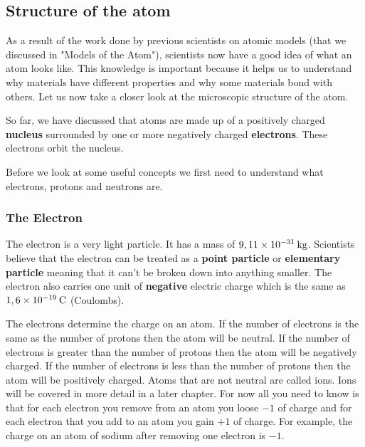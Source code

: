             \subsection{ Structure of the atom}
            \nopagebreak
      \label{m38745*id255206}As a result of the work done by previous scientists on atomic models (that we discussed in "Models of the Atom"), scientists now have a good idea of what an atom looks like. This knowledge is important because it helps us to understand why materials have different properties and why some materials bond with others. Let us now take a closer look at the microscopic structure of the atom.\par 
      \label{m38745*id255216}So far, we have discussed that atoms are made up of a positively charged \textbf{nucleus} surrounded by
one or more negatively charged \textbf{electrons}. These electrons orbit the nucleus.\par 
      \label{m38745*eip-577}Before we look at some useful concepts we first need to understand what electrons, protons and neutrons are.\par \label{m38745*uid10}
            \subsubsection{ The Electron}
            \nopagebreak
        \label{m38745*id255241}The electron is a very light particle. It has a mass of $9,11\ensuremath{\times}{10}^{-31}\phantom{\rule{2pt}{0ex}}\mathrm{kg}$.
Scientists believe that the electron can be treated as a \textbf{point particle}
or \textbf{elementary particle}
meaning that it can't be broken down into anything smaller. The electron also carries one unit
of \textbf{negative} electric charge which is the same as $1,6\ensuremath{\times}{10}^{-19}\phantom{\rule{2pt}{0ex}}\mathrm{C}$ (Coulombs).\par \label{m38745*eip-222}The electrons determine the charge on an atom. If the number of electrons is the same as the number of protons then the atom will be neutral. If the number of electrons is greater than the number of protons then the atom will be negatively charged. If the number of electrons is less than the number of protons then the atom will be positively charged. Atoms that are not neutral are called ions. Ions will be covered in more detail in a later chapter. For now all you need to know is that for each electron you remove from an atom you loose $-1$ of charge and for each electron that you add to an atom you gain $+1$ of charge. For example, the charge on an atom of sodium after removing one electron is  $-1$.\par 
      \label{m38745*uid11}

